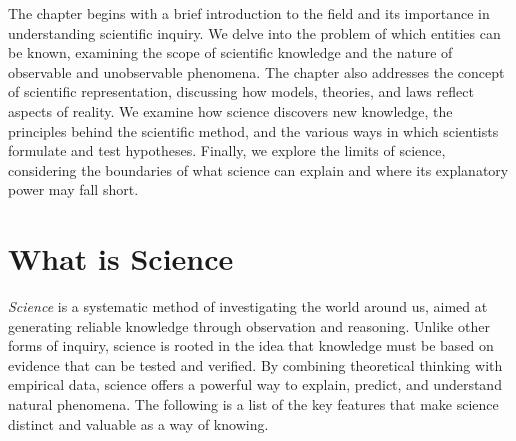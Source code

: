 The chapter begins with a brief introduction to the field and its importance in understanding scientific inquiry. We delve into the problem of which entities can be known, examining the scope of scientific knowledge and the nature of observable and unobservable phenomena. The chapter also addresses the concept of scientific representation, discussing how models, theories, and laws reflect aspects of reality. We examine how science discovers new knowledge, the principles behind the scientific method, and the various ways in which scientists formulate and test hypotheses. Finally, we explore the limits of science, considering the boundaries of what science can explain and where its explanatory power may fall short.

%
%

\section{What is Science}

\emph{Science} is a systematic method of investigating the world around us, aimed at generating reliable knowledge through observation and reasoning. Unlike other forms of inquiry, science is rooted in the idea that knowledge must be based on evidence that can be tested and verified. By combining theoretical thinking with empirical data, science offers a powerful way to explain, predict, and understand natural phenomena. The following is a list of the key features that make science distinct and valuable as a way of knowing.

